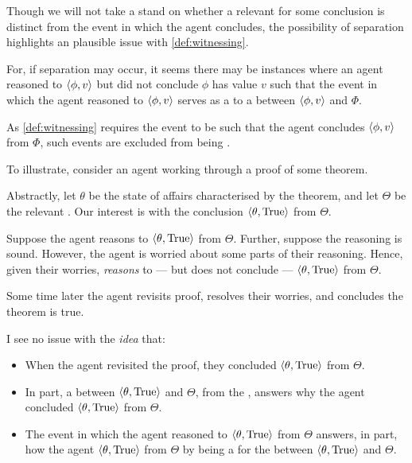 \begin{note}
  Though we will not take a stand on whether a relevant  for some conclusion is distinct from the event in which the agent concludes, the possibility of separation highlights an plausible issue with \autoref{def:witnessing}.

  For, if separation may occur, it seems there may be instances where an agent reasoned to \(\langle \phi, v \rangle\) but did not conclude \(\phi\) has value \(v\) such that the event in which the agent reasoned to \(\langle \phi, v \rangle\) serves as a  to a \ros{} between \(\langle \phi, v \rangle\) and \(\Phi\).

  As \autoref{def:witnessing} requires the event to be such that the agent concludes \(\langle \phi, v \rangle\) from \(\Phi\), such events are excluded from being .

  To illustrate, consider an agent working through a proof of some theorem.

  Abstractly, let \(\theta\) be the state of affairs characterised by the theorem, and let \(\Theta\) be the relevant \poP{}.
  Our interest is with the conclusion \(\langle \theta, \text{True} \rangle\) from \(\Theta\).

  Suppose the agent reasons to \(\langle \theta, \text{True} \rangle\) from \(\Theta\).
  Further, suppose the \agents{} reasoning is sound.
  However, the agent is worried about some parts of their reasoning.
  Hence, given their worries, \emph{reasons} to --- but does not conclude --- \(\langle \theta, \text{True} \rangle\) from \(\Theta\).

  Some time later the agent revisits proof, resolves their worries, and concludes the theorem is true.

  I see no issue with the \emph{idea} that:
  \begin{itemize}[noitemsep]
  \item
    When the agent revisited the proof, they concluded \(\langle \theta, \text{True} \rangle\) from \(\Theta\).
  \item
    In part, a \ros{} between \(\langle \theta, \text{True} \rangle\) and \(\Theta\), from the \agpe{}, answers why the agent concluded \(\langle \theta, \text{True} \rangle\) from \(\Theta\).
  \item
    The event in which the agent reasoned to \(\langle \theta, \text{True} \rangle\) from \(\Theta\) answers, in part, how the agent \(\langle \theta, \text{True} \rangle\) from \(\Theta\) by being a \wit{} for the \ros{} between \(\langle \theta, \text{True} \rangle\) and \(\Theta\).
  \end{itemize}


\end{note}
